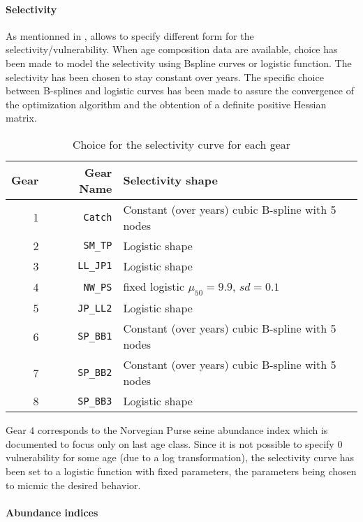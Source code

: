 \paragraph{Selectivity}
As mentionned in \cite{Martell12},	 \iscam allows to specify different form for the
selectivity/vulnerability.  When age composition data are available,
choice has been made to model  the selectivity using Bspline curves or
logistic function.  The selectivity has  been chosen to  stay constant
over years. The specific choice between B-splines and logistic curves has been made to 
assure the convergence of the optimization algorithm and the obtention of a definite positive Hessian matrix.



\begin{table}[ht]
\centering
\begin{tabular}{rrp{8cm}}
  \hline
  Gear & Gear Name & Selectivity shape \\ 
  \hline
1 & \verb+Catch+ & Constant (over years) cubic B-spline with 5 nodes \\
2 & \verb+SM_TP+ & Logistic shape \\ 	
3 & \verb+LL_JP1+ & Logistic shape \\
4 & \verb+NW_PS+ & fixed logistic $\mu_{50}=9.9$, $sd=0.1$\\
5 & \verb+JP_LL2+ & Logistic shape \\
6 & \verb+SP_BB1+ & Constant (over years) cubic B-spline with 5 nodes \\
7 & \verb+SP_BB2+ & Constant (over years) cubic B-spline with 5 nodes \\
8 & \verb+SP_BB3+ & Logistic shape \\
\hline
\end{tabular}
\caption{Choice for the selectivity curve for each gear}
\label{table:selectivity}
\end{table}


Gear  $4$ corresponds  to the  Norvegian Purse  seine abundance  index
which is documented  to focus  only on  last age  class. Since  it is  not possible  to
specify $0$ vulnerability for some  age (due to a log transformation),
the selectivity curve  has been set to a logistic  function with fixed
parameters, the parameters being chosen to micmic the desired behavior.


\paragraph{Abundance indices}



